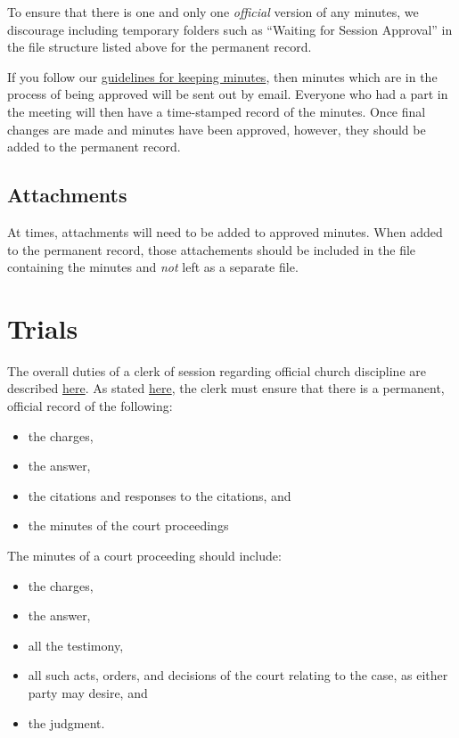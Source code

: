 \documentclass[
]{book}
\providecommand{\tightlist}{%
  \setlength{\itemsep}{0pt}\setlength{\parskip}{0pt}}
\begin{document}
To ensure that there is one and only one \emph{official} version of any minutes, we discourage including temporary folders such as ``Waiting for Session Approval'' in the file structure listed above for the permanent record.

If you follow our \href{keeping-minutes.html}{guidelines for keeping minutes}, then minutes which are in the process of being approved will be sent out by email. Everyone who had a part in the meeting will then have a time-stamped record of the minutes. Once final changes are made and minutes have been approved, however, they should be added to the permanent record.

\hypertarget{attachments}{%
\subsection{Attachments}\label{attachments}}

At times, attachments will need to be added to approved minutes. When added to the permanent record, those attachements should be included in the file containing the minutes and \emph{not} left as a separate file.

\hypertarget{trials}{%
\section{Trials}\label{trials}}

The overall duties of a clerk of session regarding official church discipline are described \href{church-discipline.html}{here}. As stated \href{church-discipline.html\#duties-of-the-clerk}{here}, the clerk must ensure that there is a permanent, official record of the following:

\begin{itemize}
\tightlist
\item
  the charges,
\item
  the answer,
\item
  the citations and responses to the citations, and
\item
  the minutes of the court proceedings
\end{itemize}

The minutes of a court proceeding should include:

\begin{itemize}
\tightlist
\item
  the charges,
\item
  the answer,
\item
  all the testimony,
\item
  all such acts, orders, and decisions of the court relating to the case, as either party may desire, and
\item
  the judgment.
\end{itemize}
\end{document}
